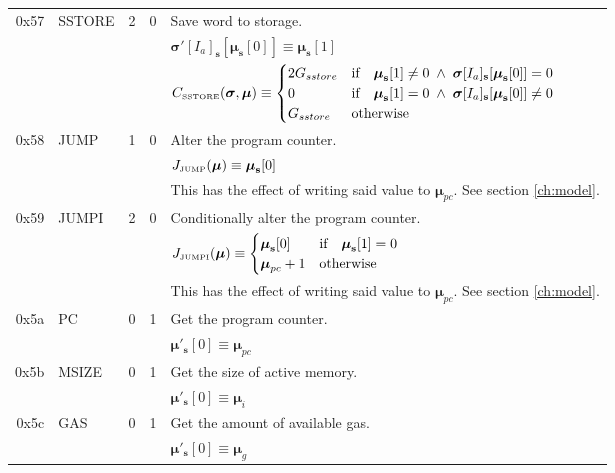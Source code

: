 \documentclass[9pt,oneside]{amsart}
\begin{document}
\begin{tabular*}{\columnwidth}[h]{rlrrl}
\midrule
0x57 & {\small SSTORE} & 2 & 0 & Save word to storage. \\
&&&& $\boldsymbol{\sigma}'[I_a]_\mathbf{s}[ \boldsymbol{\mu}_\mathbf{s}[0] ] \equiv \boldsymbol{\mu}_\mathbf{s}[1] $ \\
&&&& $C_{\text{\tiny SSTORE}}(\boldsymbol{\sigma}, \boldsymbol{\mu}) \equiv \begin{cases}
2G_{sstore} & \text{if} \quad \boldsymbol{\mu}_\mathbf{s}[1] \neq 0 \; \wedge \; \boldsymbol{\sigma}[I_a]_\mathbf{s}[\boldsymbol{\mu}_\mathbf{s}[0]] = 0 \\
0 & \text{if} \quad \boldsymbol{\mu}_\mathbf{s}[1] = 0 \; \wedge \; \boldsymbol{\sigma}[I_a]_\mathbf{s}[\boldsymbol{\mu}_\mathbf{s}[0]] \neq 0 \\
G_{sstore} & \text{otherwise}
\end{cases}$ \\
\midrule
0x58 & {\small JUMP} & 1 & 0 & Alter the program counter. \\
&&&& $J_{\text{\tiny JUMP}}(\boldsymbol{\mu}) \equiv \boldsymbol{\mu}_\mathbf{s}[0] $ \\
&&&& This has the effect of writing said value to $\boldsymbol{\mu}_{pc}$. See section \ref{ch:model}. \\
\midrule
0x59 & {\small JUMPI} & 2 & 0 & Conditionally alter the program counter. \\
&&&& $J_{\text{\tiny JUMPI}}(\boldsymbol{\mu}) \equiv \begin{cases} \boldsymbol{\mu}_\mathbf{s}[0] & \text{if} \quad \boldsymbol{\mu}_\mathbf{s}[1] = 0 \\ \boldsymbol{\mu}_{pc} + 1 & \text{otherwise} \end{cases} $ \\
&&&& This has the effect of writing said value to $\boldsymbol{\mu}_{pc}$. See section \ref{ch:model}. \\
\midrule
0x5a & {\small PC} & 0 & 1 & Get the program counter. \\
&&&& $\boldsymbol{\mu}'_\mathbf{s}[0] \equiv \boldsymbol{\mu}_{pc}$ \\
\midrule
0x5b & {\small MSIZE} & 0 & 1 & Get the size of active memory. \\
&&&& $\boldsymbol{\mu}'_\mathbf{s}[0] \equiv \boldsymbol{\mu}_{i}$ \\
\midrule
0x5c & {\small GAS} & 0 & 1 & Get the amount of available gas. \\
&&&& $\boldsymbol{\mu}'_\mathbf{s}[0] \equiv \boldsymbol{\mu}_{g}$ \\
\bottomrule
\end{tabular*}
\end{document}
